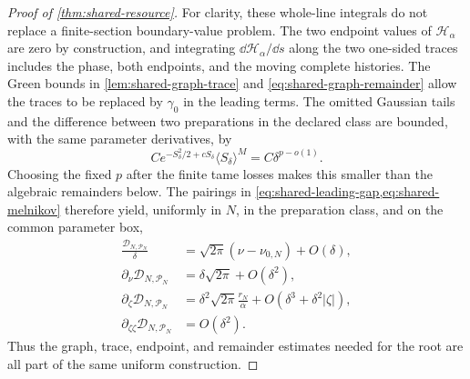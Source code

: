 \begin{proof}[Proof of \cref{thm:shared-resource}]
For clarity, these whole-line integrals do not replace a finite-section
boundary-value problem.  The two endpoint values of
\(\mathscr H_\alpha\) are zero by construction, and integrating
\(\dd\mathscr H_\alpha/\dd s\) along the two one-sided traces includes the
phase, both endpoints, and the moving complete histories.  The Green bounds
in \cref{lem:shared-graph-trace} and
\cref{eq:shared-graph-remainder} allow the traces to be replaced by
\(\gamma_0\) in the leading terms.  The omitted Gaussian tails and the
difference between two preparations in the declared class are bounded,
with the same parameter derivatives, by
\begin{equation}
 C e^{-S_\delta^2/2+cS_\delta}
       \langle S_\delta\rangle^M
 =C\delta^{p-o(1)}.                                   \label{eq:shared-gaussian-tail}
\end{equation}
Choosing the fixed \(p\) after the finite tame losses makes this smaller
than the algebraic remainders below.  The pairings in
\cref{eq:shared-leading-gap,eq:shared-melnikov} therefore yield, uniformly
in \(N\), in the preparation class, and on the common parameter box,
\begin{align}
 \frac{\mathscr D_{N,\mathcal P_N}}\delta
 &=\sqrt{2\pi}(\nu-\nu_{0,N})+O(\delta),
                                                               \label{eq:shared-gap-expansion}\\
 \partial_\nu\mathscr D_{N,\mathcal P_N}
 &=\delta\sqrt{2\pi}+O(\delta^2),                    \label{eq:shared-gap-nu}\\
 \partial_\zeta\mathscr D_{N,\mathcal P_N}
 &=\delta^2\sqrt{2\pi}\frac{r_N}{\alpha}
       +O(\delta^3+\delta^2|\zeta|),                 \label{eq:shared-gap-zeta}\\
 \partial_{\zeta\zeta}\mathscr D_{N,\mathcal P_N}
 &=O(\delta^2).                                       \label{eq:shared-gap-zz}
\end{align}
Thus the graph, trace, endpoint, and remainder estimates needed for the
root are all part of the same uniform construction.


\end{proof}

